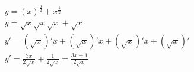 \begin{ex}
\begin{align}
&y=(x)^\frac{3}{2}+x^\frac{1}{2}\nonumber\\
&y=\sqrt{x}\sqrt{x}\sqrt{x}+\sqrt{x}\nonumber\\
&y'=(\sqrt{x})'x+(\sqrt{x})'x+(\sqrt{x})'x+(\sqrt{x})'\nonumber\\
&y'=\frac{3x}{2\sqrt{x}}+\frac{1}{2\sqrt{x}}=\frac{3x+1}{2\sqrt{x}}\nonumber
\end{align}
\end{ex}